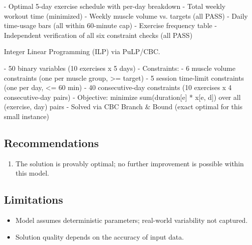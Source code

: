\documentclass[11pt, a4paper]{article}
\begin{document}
- Optimal 5-day exercise schedule with per-day breakdown
- Total weekly workout time (minimized)
- Weekly muscle volume vs. targets (all PASS)
- Daily time-usage bars (all within 60-minute cap)
- Exercise frequency table
- Independent verification of all six constraint checks (all PASS)

Integer Linear Programming (ILP) via PuLP/CBC.

- 50 binary variables (10 exercises x 5 days)
- Constraints:
  - 6 muscle volume constraints (one per muscle group, >= target)
  - 5 session time-limit constraints (one per day, <= 60 min)
  - 40 consecutive-day constraints (10 exercises x 4 consecutive-day pairs)
- Objective: minimize sum(duration[e] * x[e, d]) over all (exercise, day) pairs
- Solved via CBC Branch \& Bound (exact optimal for this small instance)



\subsection{Recommendations}

\begin{enumerate}
  \item The solution is provably optimal; no further improvement is possible within this model.
\end{enumerate}

\subsection{Limitations}

\begin{polyawarnbox}
\begin{itemize}
  \item Model assumes deterministic parameters; real-world variability not captured.
  \item Solution quality depends on the accuracy of input data.
\end{itemize}
\end{polyawarnbox}

\end{document}

